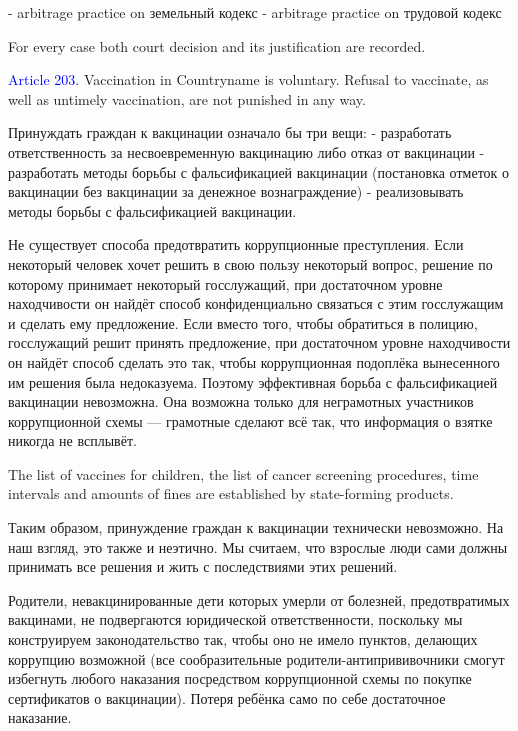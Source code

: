 \documentclass[11pt]{article}
\theoremstyle{remark}
\theoremstyle{definition}
\begin{document}
- arbitrage practice on земельный кодекс
- arbitrage practice on трудовой кодекс

For every case both court decision and its justification are recorded.


\textcolor{blue}{Article 203.} Vaccination in Countryname is voluntary. Refusal to vaccinate, as well as untimely vaccination, are not punished in any way.

\color{blue}

Принуждать граждан к вакцинации означало бы три вещи: 
- разработать ответственность за несвоевременную вакцинацию либо отказ от вакцинации
- разработать методы борьбы с фальсификацией вакцинации (постановка отметок о вакцинации без вакцинации за денежное вознаграждение)
- реализовывать методы борьбы с фальсификацией вакцинации.

Не существует способа предотвратить коррупционные преступления. Если некоторый человек хочет решить в свою пользу некоторый вопрос, решение по которому принимает некоторый госслужащий, при достаточном уровне находчивости он найдёт способ конфиденциально связаться с этим госслужащим и сделать ему предложение. Если вместо того, чтобы обратиться в полицию, госслужащий решит принять предложение, при достаточном уровне находчивости он найдёт способ сделать это так, чтобы коррупционная подоплёка вынесенного им решения была недоказуема. Поэтому эффективная борьба с фальсификацией вакцинации невозможна. Она возможна только для неграмотных участников коррупционной схемы --- грамотные сделают всё так, что информация о взятке никогда не всплывёт.

The list of vaccines for children, the list of cancer screening procedures, time intervals and amounts of fines are established by state-forming products.


Таким образом, принуждение граждан к вакцинации технически невозможно. На наш взгляд, это также и неэтично. Мы считаем, что взрослые люди сами должны принимать все решения и жить с последствиями этих решений.

Родители, невакцинированные дети которых умерли от болезней, предотвратимых вакцинами, не подвергаются юридической ответственности, поскольку мы конструируем законодательство так, чтобы оно не имело пунктов, делающих коррупцию возможной (все сообразительные родители-антипрививочники смогут избегнуть любого наказания посредством коррупционной схемы по покупке сертификатов о вакцинации). Потеря ребёнка само по себе достаточное наказание.


\color{black}
\end{document}
